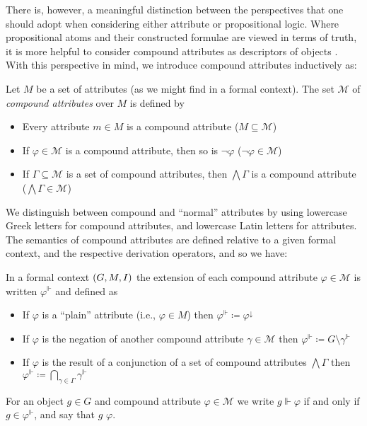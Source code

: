 There is, however, a meaningful distinction between the perspectives that one should adopt when considering either attribute or
propositional logic. Where propositional atoms and their constructed formulae are viewed in terms of truth, it is more helpful to consider
compound attributes as descriptors of objects \cite{ganter2024formal,ganter2025language}. With this perspective in mind, we introduce
compound attributes inductively as:

\begin{definition}
  \label{definition:compound-attributes}

  Let $M$ be a set of attributes (as we might find in a formal context). The set $\mathcal{M}$ of \emph{compound attributes} over $M$ is
  defined by
  \begin{itemize}
    \item Every attribute $m \in M$ is a compound attribute \hfill ($M \subseteq \mathcal{M}$)

    \item If $\varphi \in \mathcal{M}$ is a compound attribute, then so is $\neg \varphi$ \hfill ($\neg \varphi \in \mathcal{M}$)

    \item If $\Gamma \subseteq \mathcal{M}$ is a set of compound attributes, then $\bigwedge \Gamma$ is a compound attribute \hfill ($\bigwedge
      \Gamma \in \mathcal{M}$)
  \end{itemize}
\end{definition}

We distinguish between compound and ``normal'' attributes by using lowercase Greek letters for compound attributes, and lowercase Latin
letters for attributes. The semantics of compound attributes are defined relative to a given formal context, and the respective derivation
operators, and so we have:

\begin{definition}
  \label{definition:compound-attributes-semantics}

  In a formal context $(G,M,\mathrel{I})$ the extension of each compound attribute $\varphi \in \mathcal{M}$ is written $\varphi^{\Vdash}$ and defined as
  \begin{itemize}
    \item If $\varphi$ is a ``plain'' attribute (i.e., $\varphi \in M$) then $\varphi^{\Vdash}\coloneq \varphi^{\downarrow}$

    \item If $\varphi$ is the negation of another compound attribute $\gamma \in \mathcal{M}$ then $\varphi^{\Vdash}\coloneq G \setminus \gamma
      ^{\Vdash}$

    \item If $\varphi$ is the result of a conjunction of a set of compound attributes $\bigwedge \Gamma$ then $\varphi^{\Vdash}\coloneq \underset
      {\gamma \in \Gamma}\bigcap \gamma^{\Vdash}$
  \end{itemize}
  For an object $g\in G$ and compound attribute $\varphi \in \mathcal{M}$ we write $g \Vdash \varphi$ if and only if
  $g \in \varphi^{\Vdash}$, and say that $g$  $\varphi$.
\end{definition}

